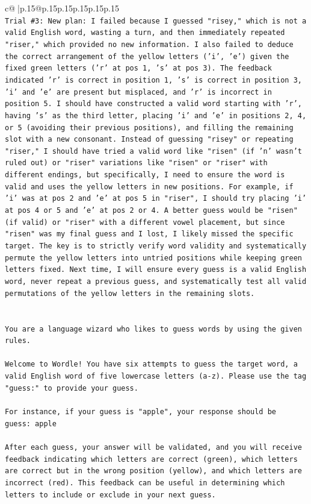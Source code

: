 \documentclass{article}
\begin{document}
{\begin{supertabular}{c@{$\;$}|p{.15\linewidth}@{}p{.15\linewidth}p{.15\linewidth}p{.15\linewidth}p{.15\linewidth}p{.15\linewidth}}
{{{\\ 
\texttt{Trial \#3: New plan: I failed because I guessed "risey," which is not a valid English word, wasting a turn, and then immediately repeated "riser," which provided no new information. I also failed to deduce the correct arrangement of the yellow letters ('i', 'e') given the fixed green letters ('r' at pos 1, 's' at pos 3). The feedback indicated 'r' is correct in position 1, 's' is correct in position 3, 'i' and 'e' are present but misplaced, and 'r' is incorrect in position 5. I should have constructed a valid word starting with 'r', having 's' as the third letter, placing 'i' and 'e' in positions 2, 4, or 5 (avoiding their previous positions), and filling the remaining slot with a new consonant. Instead of guessing "risey" or repeating "riser," I should have tried a valid word like "risen" (if 'n' wasn't ruled out) or "riser" variations like "risen" or "riser" with different endings, but specifically, I need to ensure the word is valid and uses the yellow letters in new positions. For example, if 'i' was at pos 2 and 'e' at pos 5 in "riser", I should try placing 'i' at pos 4 or 5 and 'e' at pos 2 or 4. A better guess would be "risen" (if valid) or "riser" with a different vowel placement, but since "risen" was my final guess and I lost, I likely missed the specific target. The key is to strictly verify word validity and systematically permute the yellow letters into untried positions while keeping green letters fixed. Next time, I will ensure every guess is a valid English word, never repeat a previous guess, and systematically test all valid permutations of the yellow letters in the remaining slots.} \\
\\ 
\\ 
\texttt{You are a language wizard who likes to guess words by using the given rules.} \\
\\ 
\texttt{Welcome to Wordle! You have six attempts to guess the target word, a valid English word of five lowercase letters (a{-}z). Please use the tag "guess:" to provide your guess.} \\
\\ 
\texttt{For instance, if your guess is "apple", your response should be} \\
\texttt{guess: apple} \\
\\ 
\texttt{After each guess, your answer will be validated, and you will receive feedback indicating which letters are correct (green), which letters are correct but in the wrong position (yellow), and which letters are incorrect (red). This feedback can be useful in determining which letters to include or exclude in your next guess.} \\
}}}
\end{supertabular}}
\end{document}
